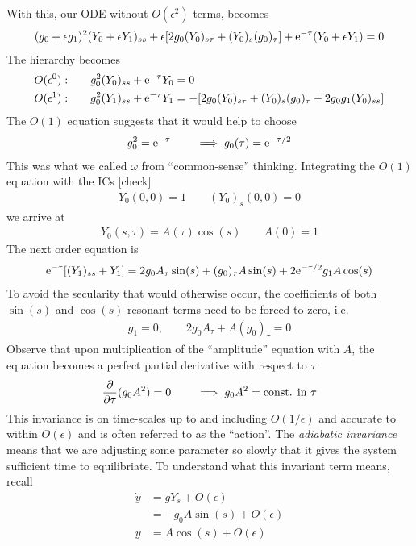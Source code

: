 With this, our ODE without $O(\epsilon^2)$ terms, becomes
\begin{align*}
	(g_0 + \epsilon g_1 )^2 (Y_0 + \epsilon Y_1)_{ss} + \epsilon [2g_0 (Y_0)_{s\tau } + (Y_0)_s (g_0)_\tau ] + \mathrm{e}^{-\tau }(Y_0 + \epsilon Y_1) = 0
\end{align*}
The hierarchy becomes
\begin{align*}
	O(\epsilon^0): \qquad & g_0^2 (Y_0)_{ss} + \mathrm{e}^{-\tau} Y_0 = 0 \\
	O(\epsilon^1): \qquad & g_0^2 (Y_1)_{ss} + \mathrm{e}^{-\tau} Y_1 = -[2g_0 (Y_0)_{s\tau } + (Y_0)_s (g_0)_\tau + 2 g_0g_1 (Y_0)_{ss}]
\end{align*}
The $O(1)$ equation suggests that it would help to choose
\begin{gather*}
	g_0^2 = \mathrm{e}^{-\tau} \qquad \implies g_0(\tau) = \mathrm{e}^{-\tau/2}
\end{gather*}
This was what we called $\omega$ from ``common-sense'' thinking. Integrating the $O(1)$ equation with the ICs {\color{red}[check] }
\begin{align*}
Y_0(0,0) = 1 \qquad (Y_0)_s(0,0) = 0 
\end{align*}
we arrive at
\begin{align*}
	Y_0(s,\tau) = A(\tau) \cos (s) \qquad A(0) = 1
\end{align*}
The next order equation is
\begin{align*}
	\mathrm{e}^{-\tau} [(Y_1)_{ss} + Y_1] = 2g_0 A_\tau \sin (s) + (g_0)_\tau A \sin (s)  + 2 \mathrm{e}^{-\tau/2} g_1  A \cos (s)
\end{align*}
To avoid the secularity that would otherwise occur, the coefficients of both $\sin(s)$ and $\cos (s)$ resonant terms need to be forced to zero, i.e.
\begin{align*}
	g_1 = 0, \qquad 2g_0 A_\tau + A (g_0)_\tau = 0
\end{align*}
Observe that upon multiplication of the ``amplitude'' equation with $A$, the equation becomes a perfect partial derivative with respect to $\tau$
\begin{gather*}
	\frac{\partial}{\partial \tau} (g_0 A^2) = 0 \qquad
	\implies g_0 A^2 = \text{const. in } \tau 
\end{gather*}
This invariance is on time-scales up to and including $O(1/\epsilon)$ and accurate to within $O(\epsilon)$ and is often referred to as the ``action''. The \emph{adiabatic invariance} means that we are adjusting some parameter so slowly that it gives the system sufficient time to equilibriate. To understand what this invariant term means, recall
\begin{align*}
	\dot y &= g Y_s + O(\epsilon) \\
	&= - g_0 A \sin (s) + O(\epsilon) \\
	y &= A \cos (s) + O(\epsilon)
\end{align*}
